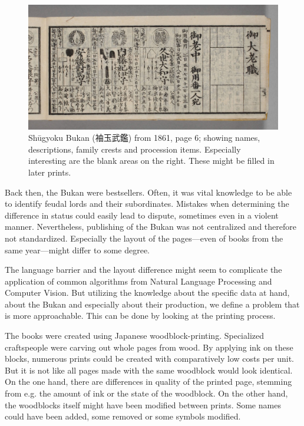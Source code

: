 \documentclass{ltjarticle}
\begin{document}
\begin{figure}
    \centering
    \includegraphics[width=\textwidth]{200019500_00006.jpg}
    \caption[Shūgyoku Bukan (袖玉武鑑), page 6]{Shūgyoku Bukan (袖玉武鑑) from 1861, page 6; showing names, descriptions, family crests and procession items. Especially interesting are the blank areas on the right. These might be filled in later prints.}
    \label{fig:shuugyokubukan006}
\end{figure}

Back then, the Bukan were bestsellers. Often, it was vital knowledge to be able to identify feudal lords and their subordinates. Mistakes when determining the difference in status could easily lead to dispute, sometimes even in a violent manner.\cite{dower1990elements} Nevertheless, publishing of the Bukan was not centralized and therefore not standardized. Especially the layout of the pages---even of books from the same year---might differ to some degree.

The language barrier and the layout difference might seem to complicate the application of common algorithms from Natural Language Processing and Computer Vision. But utilizing the knowledge about the specific data at hand, about the Bukan and especially about their production, we define a problem that is more approachable. This can be done by looking at the printing process.

The books were created using Japanese woodblock-printing. Specialized craftspeople were carving out whole pages from wood. By applying ink on these blocks, numerous prints could be created with comparatively low costs per unit. But it is not like all pages made with the same woodblock would look identical. On the one hand, there are differences in quality of the printed page, stemming from e.g. the amount of ink or the state of the woodblock. On the other hand, the woodblocks itself might have been modified between prints. Some names could have been added, some removed or some symbols modified.
\end{document}
